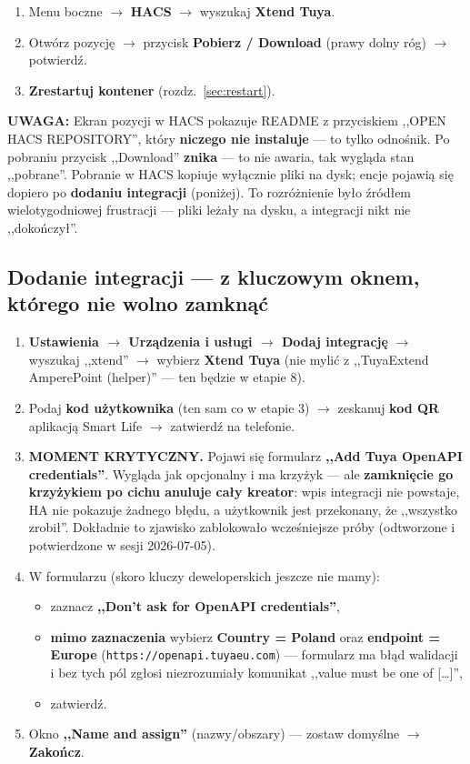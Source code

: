 \documentclass[11pt,a4paper]{article}
\newcommand{\uwaga}[1]{\par\medskip\noindent\textcolor{warnred}{\textbf{UWAGA:}} #1\par\medskip}
\begin{document}
\begin{enumerate}
\item Menu boczne $\to$ \textbf{HACS} $\to$ wyszukaj \textbf{Xtend Tuya}.
\item Otwórz pozycję $\to$ przycisk \textbf{Pobierz / Download} (prawy dolny róg) $\to$ potwierdź.
\item \textbf{Zrestartuj kontener} (rozdz.~\ref{sec:restart}).
\end{enumerate}

\uwaga{Ekran pozycji w HACS pokazuje README z przyciskiem ,,OPEN HACS REPOSITORY'', który \textbf{niczego nie instaluje} --- to tylko odnośnik. Po pobraniu przycisk ,,Download'' \textbf{znika} --- to nie awaria, tak wygląda stan ,,pobrane''. Pobranie w HACS kopiuje wyłącznie pliki na dysk; encje pojawią się dopiero po \textbf{dodaniu integracji} (poniżej). To rozróżnienie było źródłem wielotygodniowej frustracji --- pliki leżały na dysku, a integracji nikt nie ,,dokończył''.}

\subsection{Dodanie integracji --- z kluczowym oknem, którego nie wolno zamknąć}
\label{sec:krytyczne-okno}

\begin{enumerate}
\item \textbf{Ustawienia $\to$ Urządzenia i usługi $\to$ Dodaj integrację} $\to$ wyszukaj ,,xtend'' $\to$ wybierz \textbf{Xtend Tuya} (nie mylić z ,,TuyaExtend AmperePoint (helper)'' --- ten będzie w etapie 8).
\item Podaj \textbf{kod użytkownika} (ten sam co w etapie 3) $\to$ zeskanuj \textbf{kod QR} aplikacją Smart Life $\to$ zatwierdź na telefonie.
\item \textbf{MOMENT KRYTYCZNY.} Pojawi się formularz \textbf{,,Add Tuya OpenAPI credentials''}. Wygląda jak opcjonalny i ma krzyżyk --- ale \textbf{zamknięcie go krzyżykiem po cichu anuluje cały kreator}: wpis integracji nie powstaje, HA nie pokazuje żadnego błędu, a użytkownik jest przekonany, że ,,wszystko zrobił''. Dokładnie to zjawisko zablokowało wcześniejsze próby (odtworzone i potwierdzone w sesji 2026-07-05).
\item W formularzu (skoro kluczy deweloperskich jeszcze nie mamy):
  \begin{itemize}
  \item zaznacz \textbf{,,Don't ask for OpenAPI credentials''},
  \item \textbf{mimo zaznaczenia} wybierz \textbf{Country = Poland} oraz \textbf{endpoint = Europe} (\texttt{https://openapi.tuyaeu.com}) --- formularz ma błąd walidacji i bez tych pól zgłosi niezrozumiały komunikat ,,value must be one of [\ldots]'',
  \item zatwierdź.
  \end{itemize}
\item Okno \textbf{,,Name and assign''} (nazwy/obszary) --- zostaw domyślne $\to$ \textbf{Zakończ}.
\end{enumerate}
\end{document}
